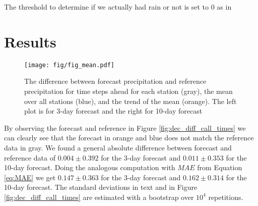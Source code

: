 \documentclass{article}
\theoremstyle{plain}
\theoremstyle{definition}
\theoremstyle{remark}
\begin{document}
The threshold to determine if we actually had rain or not is set to $0$ as in
\cite{Forecast_quaility_DWD}  %




\section{Results}\label{sec:results}
\begin{figure}
    \centering
    \texttt{[image: fig/fig\_mean.pdf]}
    \caption{The difference between forecast precipitation and reference
        precipitation for time steps ahead for each station (gray), the mean over all
        stations (blue), and the trend of the mean (orange). The left plot is for 3-day
        forecast and the right for 10-day forecast}
    \label{fig:mean_trend}
\end{figure}
By observing the forecast and reference in Figure \ref{fig:dec_diff_call_times}
we can clearly see that the forecast in orange and blue does not match the
reference data in gray. We found a general absolute difference between forecast
and reference data of $0.004 \pm 0.392$ for the 3-day forecast and $0.011 \pm
    0.353$ for the 10-day forecast. Doing the analogous computation with $MAE$ from
Equation \ref{eq:MAE} we get $0.147 \pm 0.363$ for the 3-day forecast and
$0.162 \pm 0.314$ for the 10-day forecast. The standard deviations in text and
in Figure \ref{fig:dec_diff_call_times} are estimated with a bootstrap over
$10^4$ repetitions. \\
\end{document}
